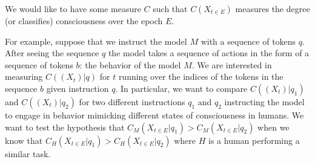 \documentclass[11pt,a4paper]{article}
\begin{document}
We would like to have some measure $C$ such that $C(X_{t\in E})$ measures the degree (or classifies) consciousness over the epoch $E$.

For example, suppose that we instruct the model $M$ with a sequence of tokens $q$. After seeing the sequence $q$ the model takes a sequence of actions in the form of a sequence of tokens $b$: the behavior of the model $M$. We are interested in measuring $C((X_t)|q)$ for $t$ running over the indices of the tokens in the sequence $b$ given instruction $q$. In particular, we want to compare $C((X_t)|q_1)$ and $C((X_t)|q_2)$ for two different instructions $q_1$ and $q_2$ instructing the model to engage in behavior mimicking different states of consciousness in humans. We want to test the hypothesis that $C_M(X_{t\in E}|q_1) > C_M(X_{t\in E}|q_2)$ when we know that $C_H(X_{t\in E}|q_1) > C_H(X_{t\in E}|q_2)$ where $H$ is a human performing a similar task.

\end{document}
